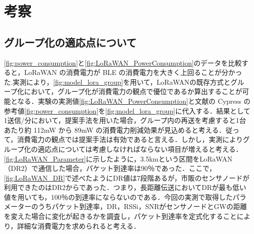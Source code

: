 \chapter{考察}
\section{グループ化の適応点について}
\ref{fig:power_consumption}と\ref{fig:LoRaWAN_PowerConsumption}のデータを比較すると，LoRaWAN の消費電力が BLE の消費電力を大きく上回ることが分かった.実測により，\ref{fig:model_lora_group}を用いて，LoRaWANの既存方式とグループ化において，グループ化が消費電力の観点で優位であるか算出することが可能となる．実験の実測値\ref{fig:LoRaWAN_PowerConsumption}と文献の Cypress の参考値\ref{fig:power_consumption}を\ref{fig:model_lora_group}に代入する．結果として1送信/分において，提案手法を用いた場合，グループ内の再送を考慮すると1台あたり約 112mW から 89mW の消費電力削減効果が見込めると考える．従って，消費電力の観点では提案手法は有効であると言える．しかし，実測によりグループ化の適応点については考慮しなければならない項目が増えると考える．\ref{fig:LoRaWAN_Parameter}に示したように，3.5kmという区間をLoRaWAN（DR2）で通信した場合，パケット到達率は90％であった．ここで，\ref{fig:LoRaWAN_DR}で述べたようにDR値は7段階あるが，市販のセンサノードが利用できたのはDR2からであった．つまり，長距離伝送においてDRが最も低い値を用いても，100％の到達率にならないのである．今回の実測で取得したパラメーターのうちパケット到達率，DR，RSSi，SNRがセンサノードとGWの距離を変えた場合に変化が起きるかを調査し，パケット到達率を定式化することにより，詳細な消費電力を求められると考える．